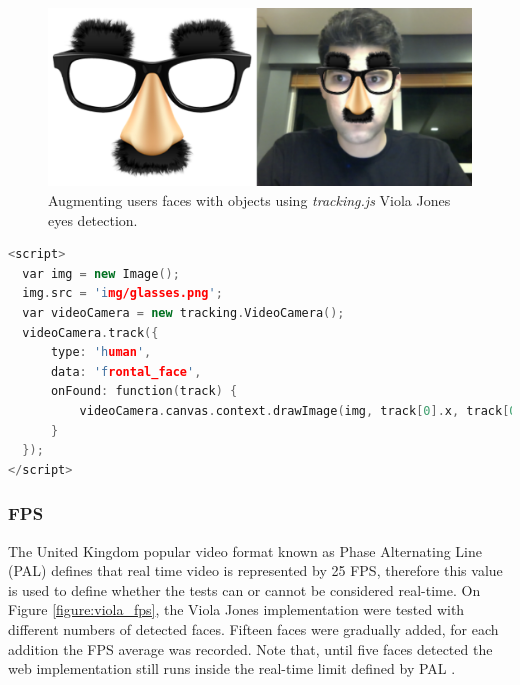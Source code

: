 \begin{figure}[!htb]
  \centering
  \includegraphics[width=380pt]{chapters/evaluation/viola_glass_face.png}
  \caption{Augmenting users faces with objects using \textit{tracking.js} Viola Jones eyes detection.}
  \label{figure:viola_glass_face}
\end{figure}

\begin{lstlisting}[language=C++,label={lst:viola},caption=Example of \textit{tracking.js} API of augmenting users faces with objects using Viola Jones eyes detection.]
<script>
  var img = new Image();
  img.src = 'img/glasses.png';
  var videoCamera = new tracking.VideoCamera();
  videoCamera.track({
      type: 'human',
      data: 'frontal_face',
      onFound: function(track) {
          videoCamera.canvas.context.drawImage(img, track[0].x, track[0].y, track[0].size, track[0].size);
      }
  });
</script>
\end{lstlisting}


\subsubsection{FPS} %
\label{subsub:evaluation:results:rapid_object_detection:fps}

The United Kingdom popular video format known as Phase Alternating Line (PAL) \cite{PAL1962} defines that real time video is represented by 25 FPS, therefore this value is used to define whether the tests can or cannot be considered real-time. On Figure \ref{figure:viola_fps}, the Viola Jones implementation were tested with different numbers of detected faces. Fifteen faces were gradually added, for each addition the FPS average was recorded. Note that, until five faces detected the web implementation still runs inside the real-time limit defined by PAL \cite{PAL1962}.

